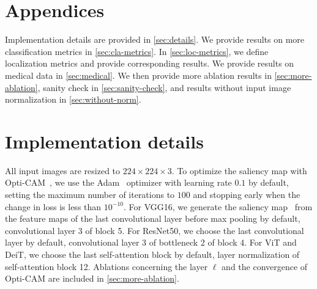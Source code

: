 \clearpage




\appendix


\renewcommand{\theequation}{A\arabic{equation}}
\renewcommand{\thetable}{A\arabic{table}}
\renewcommand{\thefigure}{A\arabic{figure}}


\section*{Appendices}

Implementation details are provided in \autoref{sec:details}. We provide results on more classification metrics in \autoref{sec:cla-metrics}. In \autoref{sec:loc-metrics}, we define localization metrics and provide corresponding results. We provide results on medical data in \autoref{sec:medical}. We then provide more ablation results in \autoref{sec:more-ablation}, sanity check in \autoref{sec:sanity-check}, and results without input image normalization in \autoref{sec:without-norm}. 


\section{Implementation details}
\label{sec:details}

All input images are resized to $224 \times 224 \times 3$. To optimize the saliency map with Opti-CAM~, we use the Adam~\citep{kingma2014adam} optimizer with learning rate $0.1$ by default, setting the maximum number of iterations to $100$ and stopping early when the change in loss is less than $10^{-10}$. For VGG16, we generate the saliency map~ from the feature maps of the last convolutional layer before max pooling by default, \ie convolutional layer 3 of block 5. For ResNet50, we choose the last convolutional layer by default, \ie convolutional layer 3 of bottleneck 2 of block 4. For ViT and DeiT, we choose the last self-attention block by default, \ie layer normalization of self-attention block 12. Ablations concerning the layer $\ell$ and the convergence of Opti-CAM are included in \autoref{sec:more-ablation}.

